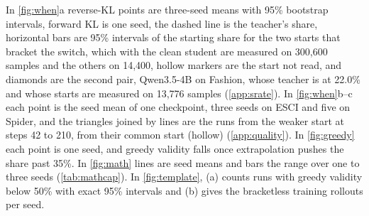 In \cref{fig:when}a reverse-KL points are three-seed means with 95\% bootstrap intervals, forward KL is one seed, the dashed line is the teacher's share, horizontal bars are 95\% intervals of the starting share for the two starts that bracket the switch, which with the clean student are measured on 300,600 samples and the others on 14,400, hollow markers are the start not read, and diamonds are the second pair, Qwen3.5-4B on Fashion, whose teacher is at 22.0\% and whose starts are measured on 13,776 samples (\cref{app:srate}).
In \cref{fig:when}b--c each point is the seed mean of one checkpoint, three seeds on ESCI and five on Spider, and the triangles joined by lines are the runs from the weaker start at steps 42 to 210, from their common start (hollow) (\cref{app:quality}).
In \cref{fig:greedy} each point is one seed, and greedy validity falls once extrapolation pushes the share past 35\%.
In \cref{fig:math} lines are seed means and bars the range over one to three seeds (\cref{tab:mathcap}).
In \cref{fig:template}, (a) counts runs with greedy validity below 50\% with exact 95\% intervals and (b) gives the bracketless training rollouts per seed.
